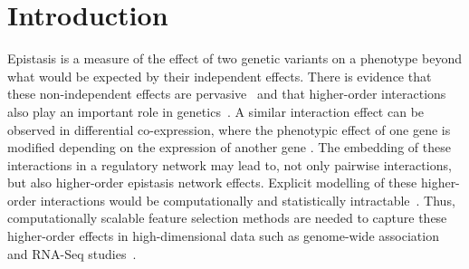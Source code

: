 \documentclass[10pt]{article}
\begin{document}
\begin{abstract}
\\

\end{abstract}


\section{Introduction}

Epistasis is a measure of the effect of two genetic variants on a phenotype beyond what would be expected by their independent effects. There is evidence that these non-independent effects are pervasive~\cite{breen12} and that higher-order interactions also play an important role in genetics~\cite{weinreich13}. 
A similar interaction effect can be observed in differential co-expression, where the phenotypic effect of one gene is modified depending on the expression of another gene \cite{lareau15,diffcoexp10}.
The embedding of these interactions in a regulatory network may lead to, not only pairwise interactions, but also higher-order epistasis network effects. Explicit modelling of these higher-order interactions would be computationally and statistically intractable~\cite{riesselman18}.
Thus, computationally scalable feature selection methods are needed to capture these higher-order effects in high-dimensional data such as genome-wide association~\cite{titv} and RNA-Seq studies~\cite{stir}.
\end{document}
